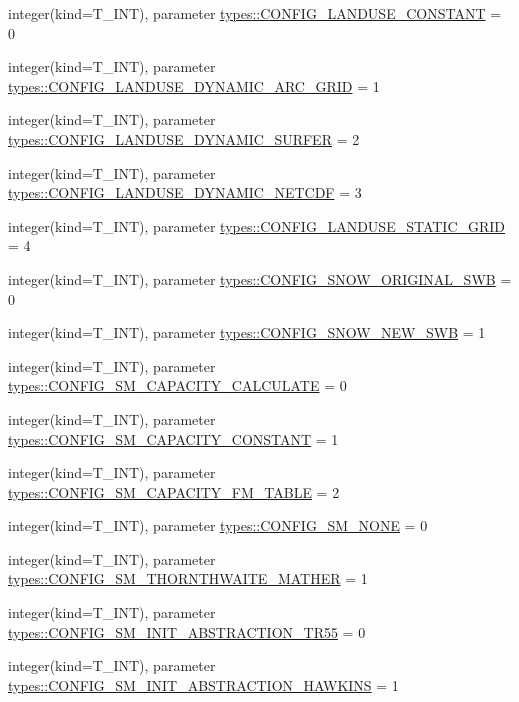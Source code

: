 \begin{DoxyCompactItemize}
\item 
integer(kind=T\_\-INT), parameter \hyperlink{namespacetypes_a1bc536b5292ca49354232a3d23eb7e79}{types::CONFIG\_\-LANDUSE\_\-CONSTANT} = 0
\item 
integer(kind=T\_\-INT), parameter \hyperlink{namespacetypes_adcf4488697f417e70c6730294b1d11ba}{types::CONFIG\_\-LANDUSE\_\-DYNAMIC\_\-ARC\_\-GRID} = 1
\item 
integer(kind=T\_\-INT), parameter \hyperlink{namespacetypes_a953dbde53597b3e1676b05d1c09c89f7}{types::CONFIG\_\-LANDUSE\_\-DYNAMIC\_\-SURFER} = 2
\item 
integer(kind=T\_\-INT), parameter \hyperlink{namespacetypes_a7eff03ddd24b0d84b74382dc2b48dea6}{types::CONFIG\_\-LANDUSE\_\-DYNAMIC\_\-NETCDF} = 3
\item 
integer(kind=T\_\-INT), parameter \hyperlink{namespacetypes_a1900797780d82e576dffd4a2244c09db}{types::CONFIG\_\-LANDUSE\_\-STATIC\_\-GRID} = 4
\item 
integer(kind=T\_\-INT), parameter \hyperlink{namespacetypes_aa50ad6a9ffea3de1d907fcde9d600afa}{types::CONFIG\_\-SNOW\_\-ORIGINAL\_\-SWB} = 0
\item 
integer(kind=T\_\-INT), parameter \hyperlink{namespacetypes_a37b9635b00b061613505232f7f0402e9}{types::CONFIG\_\-SNOW\_\-NEW\_\-SWB} = 1
\item 
integer(kind=T\_\-INT), parameter \hyperlink{namespacetypes_a67150551220cbe5b199d578709e71d15}{types::CONFIG\_\-SM\_\-CAPACITY\_\-CALCULATE} = 0
\item 
integer(kind=T\_\-INT), parameter \hyperlink{namespacetypes_a36ff9b99df167660591ebadeffa4cf54}{types::CONFIG\_\-SM\_\-CAPACITY\_\-CONSTANT} = 1
\item 
integer(kind=T\_\-INT), parameter \hyperlink{namespacetypes_a1e791678151ab504a924265e5f999d4e}{types::CONFIG\_\-SM\_\-CAPACITY\_\-FM\_\-TABLE} = 2
\item 
integer(kind=T\_\-INT), parameter \hyperlink{namespacetypes_a95a5322e516a01cb15894b055211c626}{types::CONFIG\_\-SM\_\-NONE} = 0
\item 
integer(kind=T\_\-INT), parameter \hyperlink{namespacetypes_ab0238e5ae5af01cbed3d4744b054f4b7}{types::CONFIG\_\-SM\_\-THORNTHWAITE\_\-MATHER} = 1
\item 
integer(kind=T\_\-INT), parameter \hyperlink{namespacetypes_a479612698829962978355c82816e1875}{types::CONFIG\_\-SM\_\-INIT\_\-ABSTRACTION\_\-TR55} = 0
\item 
integer(kind=T\_\-INT), parameter \hyperlink{namespacetypes_a580e1bc2da4e4c9c9881e31d2ee11478}{types::CONFIG\_\-SM\_\-INIT\_\-ABSTRACTION\_\-HAWKINS} = 1

\end{DoxyCompactItemize}
